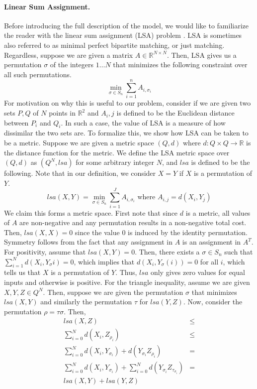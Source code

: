 \documentclass{article}
\begin{document}
\paragraph{Linear Sum Assignment.}
Before introducing the full description of the model, we would like to familiarize the reader with the linear sum assignment (LSA) problem \cite{linearsumassignment}. LSA is sometimes also referred to as minimal perfect bipartite matching, or just matching. Regardless, suppose we are given a matrix $A \in \mathbb{R}^{N \times N}$. Then, LSA gives us a permutation $\sigma$ of the integers $1 \ldots N$ that minimizes the following constraint over all such permutations.
\[
    \min_{\sigma \in S_{n}} \sum_{i = 1}^{n} A_{i, \sigma_i}
\]
For motivation on why this is useful to our problem, consider if we are given two sets $P, Q$ of $N$ points in $\mathbb{R}^2$ and $A_i,j$ is defined to be the Euclidean distance between $P_i$ and $Q_i$. In such a case, the value of LSA is a measure of how dissimilar the two sets are. To formalize this, we show how LSA can be taken to be a metric. Suppose we are given a metric space $(Q, d)$ where $d: Q \times Q \to \mathbb{R}$ is the distance function for the metric. We define the LSA metric space over $(Q,d)$ as $(Q^{N}, lsa)$ for some arbitrary integer $N$, and $lsa$ is defined to be the following. Note that in our definition, we consider $X = Y$ if $X$ is a permutation of $Y$.
\[
    lsa(X,Y) = \min_{\sigma \in S_{n}} \sum_{i = 1}^{J} A_{i, \sigma_i} \text{ where } A_{i, j} = d(X_i, Y_{j})
\]
We claim this forms a metric space. First note that since $d$ is a metric, all values of $A$ are non-negative and any permutation results in a non-negative total cost. Then, $lsa(X,X) = 0$ since the value $0$ is induced by the identity permutation. Symmetry follows from the fact that any assignment in $A$ is an assignment in $A^{T}$. For positivity, assume that $lsa(X, Y) = 0$. Then, there exists a $\sigma \in S_n$ such that $\sum_{i = 1}^{N}d(X_i, Y_\sigma{i}) = 0$, which implies that $d(X_i, Y_\sigma(i)) = 0$ for all $i$, which tells us that $X$ is a permutation of $Y$. Thus, $lsa$ only gives zero values for equal inputs and otherwise is positive. For the triangle inequality, assume we are given $X, Y, Z \in Q^{N}$. Then, suppose we are given the permutation $\sigma$ that minimizes $lsa(X, Y)$ and similarly the permutation $\tau$ for $lsa(Y, Z)$. Now, consider the permutation $\rho = \tau\sigma$. Then,
\begin{align*}
    lsa(X, Z) & \le \\
    \sum_{i = 0}^{N}d(X_{i}, Z_{\rho_{i}}) & \le \\
    \sum_{i = 0}^{N}d(X_{i}, Y_{\sigma_{i}}) + d(Y_{\sigma_{i}}Z_{\rho_{i}}) & = \\
    \sum_{i = 0}^{N}d(X_{i}, Y_{\sigma_{i}}) + \sum_{i = 0}^{N} d(Y_{\sigma_{i}}Z_{\tau_{\sigma_{i}}}) & = \\
    lsa(X, Y) + lsa(Y, Z)
\end{align*}
\end{document}
